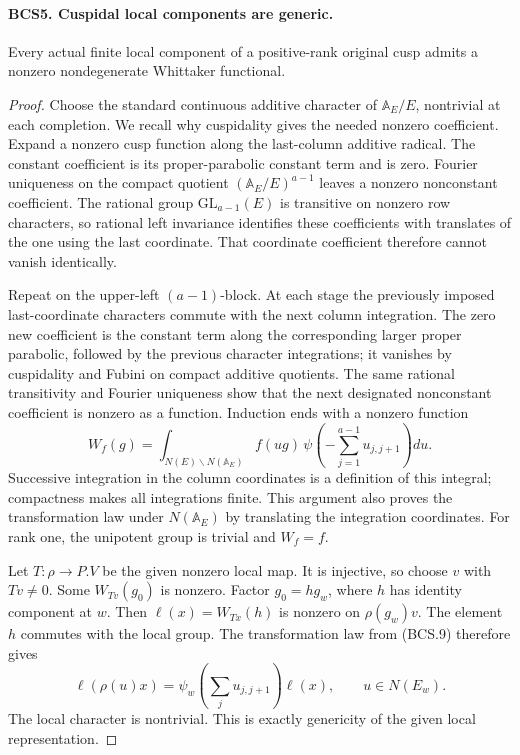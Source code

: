 \paragraph{BCS5. Cuspidal local components are generic.}
\label{claim:BCS5}
Every actual finite local component of a positive-rank original cusp
admits a nonzero nondegenerate Whittaker functional.
\begin{proof}
Choose the standard continuous additive character of
\(\mathbb A_E/E\), nontrivial at each completion.  We recall why
cuspidality gives the needed nonzero coefficient.  Expand a nonzero
cusp function along the last-column additive radical.  The constant
coefficient is its proper-parabolic constant term and is zero.
Fourier uniqueness on the compact quotient
\((\mathbb A_E/E)^{a-1}\) leaves a nonzero nonconstant coefficient.
The rational group \(\mathrm{GL}_{a-1}(E)\) is transitive on
nonzero row characters, so rational left invariance identifies these
coefficients with translates of the one using the last coordinate.
That coordinate coefficient therefore cannot vanish identically.

Repeat on the upper-left \((a-1)\)-block.  At each stage the
previously imposed last-coordinate characters commute with the next
column integration.  The zero new coefficient is the constant term
along the corresponding larger proper parabolic, followed by the
previous character integrations; it vanishes by cuspidality and
Fubini on compact additive quotients.  The same rational transitivity
and Fourier uniqueness show that the next designated nonconstant
coefficient is nonzero as a function.  Induction ends with a
nonzero function
\[
 W_f(g)=\int_{N(E)\backslash N(\mathbb A_E)}
     f(ug)\,\psi\!\left(-\sum_{j=1}^{a-1}u_{j,j+1}\right)du.
 \tag{BCS.9}
\]
Successive integration in the column coordinates is a definition of
this integral; compactness makes all integrations finite.  This
argument also proves the transformation law under \(N(\mathbb A_E)\)
by translating the integration coordinates.  For rank one, the
unipotent group is trivial and \(W_f=f\).

Let \(T:\rho\to P.V\) be the given nonzero local map.  It is
injective, so choose \(v\) with \(Tv\ne0\).  Some
\(W_{Tv}(g_0)\) is nonzero.  Factor \(g_0=h g_w\), where \(h\)
has identity component at \(w\).  Then
\(\ell(x)=W_{Tx}(h)\) is nonzero on \(\rho(g_w)v\).
The element \(h\) commutes with the local group.  The transformation
law from (BCS.9) therefore gives
\[
 \ell(\rho(u)x)=\psi_w\!\left(\sum_j u_{j,j+1}\right)\ell(x),
                         \qquad u\in N(E_w).
\]
The local character is nontrivial.  This is exactly genericity of
the given local representation.
\end{proof}

